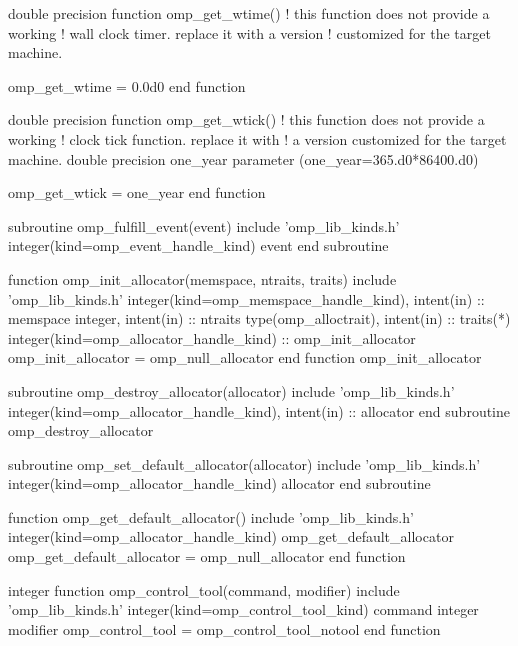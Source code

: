 {\begin{ompfFunction}
double precision function omp_get_wtime()
  ! this function does not provide a working
  ! wall clock timer. replace it with a version
  ! customized for the target machine.

  omp_get_wtime = 0.0d0
end function

double precision function omp_get_wtick()
  ! this function does not provide a working
  ! clock tick function. replace it with
  ! a version customized for the target machine.
  double precision one_year
  parameter (one_year=365.d0*86400.d0)

  omp_get_wtick = one_year
end function

subroutine omp_fulfill_event(event)
  include 'omp_lib_kinds.h'
  integer(kind=omp_event_handle_kind) event
end subroutine

function omp_init_allocator(memspace, ntraits, traits)
  include 'omp_lib_kinds.h'
  integer(kind=omp_memspace_handle_kind), intent(in) :: memspace
  integer, intent(in) :: ntraits
  type(omp_alloctrait), intent(in) :: traits(*)
  integer(kind=omp_allocator_handle_kind) :: omp_init_allocator
  omp_init_allocator = omp_null_allocator
end function omp_init_allocator

subroutine omp_destroy_allocator(allocator)
  include 'omp_lib_kinds.h'
  integer(kind=omp_allocator_handle_kind), intent(in) :: allocator
end subroutine omp_destroy_allocator

subroutine omp_set_default_allocator(allocator)
  include 'omp_lib_kinds.h'
  integer(kind=omp_allocator_handle_kind) allocator
end subroutine

function omp_get_default_allocator()
  include 'omp_lib_kinds.h'
  integer(kind=omp_allocator_handle_kind) omp_get_default_allocator
  omp_get_default_allocator = omp_null_allocator
end function

integer function omp_control_tool(command, modifier)
  include 'omp_lib_kinds.h'
  integer(kind=omp_control_tool_kind) command
  integer modifier
  omp_control_tool = omp_control_tool_notool
end function

\end{ompfFunction}} %
